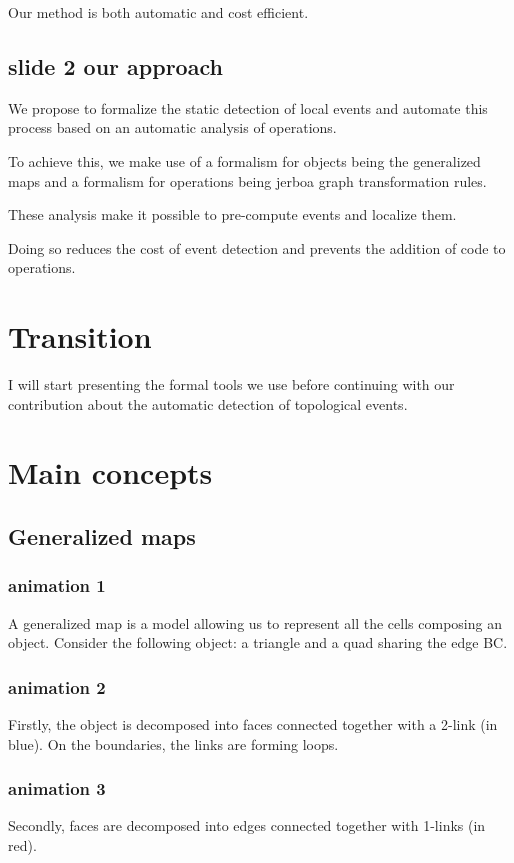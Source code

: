 \documentclass[11pt]{article}
\begin{document}
Our method is both automatic and cost efficient.

\subsection{slide 2 our approach}
\label{sec:org56781c5}
We propose to formalize the static detection of local events and automate this
process based on an automatic analysis of operations.

To achieve this, we make use of a formalism for objects being the generalized
maps and a formalism for operations being jerboa graph transformation rules.

These analysis make it possible to pre-compute events and localize them.

Doing so reduces the cost of event detection and prevents the addition of code
to operations.

\section{Transition}
\label{sec:orgeecc476}

I will start presenting the formal tools we use before continuing with our
contribution about the automatic detection of topological events.

\section{Main concepts}
\label{sec:org68dcd23}
\subsection{Generalized maps}
\label{sec:orgf4120e0}

\subsubsection{animation 1}
\label{sec:orgb3f2743}
A generalized map is a model allowing us to represent all the cells composing an
object. Consider the following object: a triangle and a quad sharing the edge
BC.
\subsubsection{animation 2}
\label{sec:org783d53a}
Firstly, the object is decomposed into faces connected together with a 2-link
(in blue). On the boundaries, the links are forming loops.
\subsubsection{animation 3}
\label{sec:org4c56291}
Secondly, faces are decomposed into edges connected together with 1-links (in
red).
\end{document}
